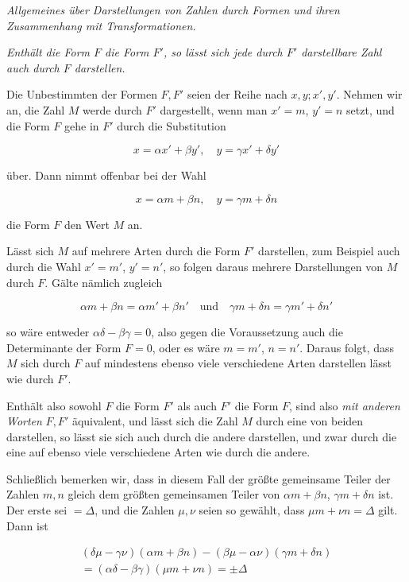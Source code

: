\begin{center}\emph{Allgemeines über Darstellungen von Zahlen durch Formen und ihren Zusammenhang mit Transformationen.}\end{center}


\emph{Enthält die Form $F$ die Form $F'$, so lässt sich jede durch $F'$ darstellbare Zahl auch durch $F$ darstellen.}

Die Unbestimmten der Formen $F,F'$ seien der Reihe nach $x,y;x',y'$. Nehmen wir an, die Zahl $M$ werde durch $F'$ dargestellt, wenn man $x'=m$, $y'=n$ setzt, und die Form $F$ gehe in $F'$ durch die Substitution

\[
x=\alpha x'+\beta y',\quad y=\gamma x'+\delta y'
\]


über. Dann nimmt offenbar bei der Wahl

\[
x=\alpha m+\beta n,\quad y=\gamma m+\delta n
\]

die Form $F$ den Wert $M$ an.

Lässt sich $M$ auf mehrere Arten durch die Form $F'$ darstellen, zum Beispiel auch durch die Wahl $x'=m'$, $y'=n'$, so folgen daraus mehrere Darstellungen von $M$ durch $F$. Gälte nämlich zugleich

\[
\alpha m+\beta n=\alpha m'+\beta n'\quad\text{und}\quad\gamma m+\delta n=\gamma m'+\delta n'
\]

so wäre entweder $\alpha\delta-\beta\gamma=0$, also gegen die Voraussetzung auch die Determinante der Form $F=0$, oder es wäre $m=m'$, $n=n'$. Daraus folgt, dass $M$ sich durch $F$ auf mindestens ebenso viele verschiedene Arten darstellen lässt wie durch $F'$.

Enthält also sowohl $F$ die Form $F'$ als auch $F'$ die Form $F$, sind also \emph{mit anderen Worten} $F,F'$ äquivalent, und lässt sich die Zahl $M$ durch eine von beiden darstellen, so lässt sie sich auch durch die andere darstellen, und zwar durch die eine auf ebenso viele verschiedene Arten wie durch die andere.

Schließlich bemerken wir, dass in diesem Fall der größte gemeinsame Teiler der Zahlen $m,n$ gleich dem größten gemeinsamen Teiler von $\alpha m+\beta n$, $\gamma m+\delta n$ ist. Der erste sei $=\Delta$, und die Zahlen $\mu,\nu$ seien so gewählt, dass $\mu m+\nu n=\Delta$ gilt. Dann ist

\[
\begin{gathered}(\delta\mu-\gamma\nu)(\alpha m+\beta n)-(\beta\mu-\alpha\nu)(\gamma m+\delta n)\\=(\alpha\delta-\beta\gamma)(\mu m+\nu n)=\pm\Delta\end{gathered}
\]

